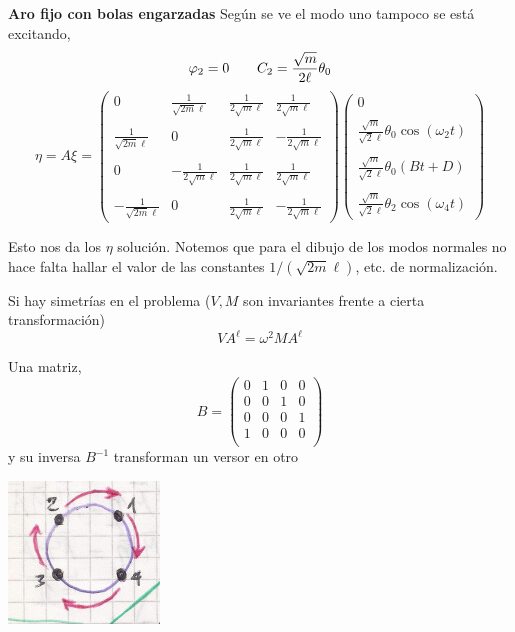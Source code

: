 \documentclass[10pt,oneside]{CBFT_book}
\begin{document}
\begin{ejemplo}{\bf Aro fijo con bolas engarzadas}
Según se ve el modo uno tampoco se está excitando,
\[
	\varphi_2 = 0 \qquad C_2 = \frac{\sqrt{m}}{2\ell} \theta_0
\]
\[
	\eta = A \xi = \begin{pmatrix}
	        0 & \frac{1}{\sqrt{2m}\ell} & \frac{1}{2\sqrt{m}\ell} & \frac{1}{2\sqrt{m}\ell} \\
	        \\
	        \frac{1}{\sqrt{2m}\ell} & 0 & \frac{1}{2\sqrt{m}\ell} & -\frac{1}{2\sqrt{m}\ell} \\
	        \\
	        0 & -\frac{1}{2\sqrt{m}\ell} & \frac{1}{2\sqrt{m}\ell} & \frac{1}{2\sqrt{m}\ell} \\
	        \\
	        -\frac{1}{\sqrt{2m}\ell} & 0 & \frac{1}{2\sqrt{m}\ell} & -\frac{1}{2\sqrt{m}\ell} 
	        \end{pmatrix}
	        \begin{pmatrix}
		0 \\
		\\
		\frac{\sqrt{m}}{\sqrt{2}\ell} \theta_0 \cos(\omega_2 t)\\
		\\
		\frac{\sqrt{m}}{\sqrt{2}\ell} \theta_0 ( Bt + D ) \\
		\\
		\frac{\sqrt{m}}{\sqrt{2}\ell} \theta_2 \cos(\omega_4 t)
	        \end{pmatrix}
\]

Esto nos da los $\eta$ solución.
Notemos que para el dibujo de los modos normales no hace falta hallar el valor de las constantes $1/(\sqrt{2m}\ell)$, etc. de
normalización.


Si hay simetrías en el problema ($V,M$ son invariantes frente a cierta transformación)
\[
	VA^\ell = \omega^2 M A^\ell
\]

Una matriz,
\[
	B = \begin{pmatrix}
	0 & 1 & 0 & 0 \\
	0 & 0 & 1 & 0 \\
	0 & 0 & 0 & 1 \\
	1 & 0 & 0 & 0 \\
	\end{pmatrix}
\]
y su inversa $B^{-1}$ transforman un versor en otro

\includegraphics[scale=0.5]{images/fig_mc_problema_aro_modos_normales_9.jpg} 


\end{ejemplo}
\end{document}
